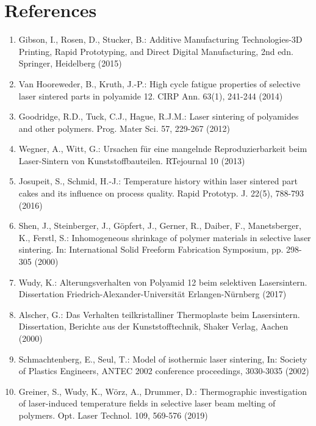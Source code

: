 \documentclass[10pt]{article}
\begin{document}
\section*{References}
\begin{enumerate}
  \item Gibson, I., Rosen, D., Stucker, B.: Additive Manufacturing Technologies-3D Printing, Rapid Prototyping, and Direct Digital Manufacturing, 2nd edn. Springer, Heidelberg (2015)

  \item Van Hooreweder, B., Kruth, J.-P.: High cycle fatigue properties of selective laser sintered parts in polyamide 12. CIRP Ann. 63(1), 241-244 (2014)

  \item Goodridge, R.D., Tuck, C.J., Hague, R.J.M.: Laser sintering of polyamides and other polymers. Prog. Mater Sci. 57, 229-267 (2012)

  \item Wegner, A., Witt, G.: Ursachen für eine mangelnde Reproduzierbarkeit beim Laser-Sintern von Kunststoffbauteilen. RTejournal 10 (2013)

  \item Josupeit, S., Schmid, H.-J.: Temperature history within laser sintered part cakes and its influence on process quality. Rapid Prototyp. J. 22(5), 788-793 (2016)

  \item Shen, J., Steinberger, J., Göpfert, J., Gerner, R., Daiber, F., Manetsberger, K., Ferstl, S.: Inhomogeneous shrinkage of polymer materials in selective laser sintering. In: International Solid Freeform Fabrication Symposium, pp. 298-305 (2000)

  \item Wudy, K.: Alterungsverhalten von Polyamid 12 beim selektiven Lasersintern. Dissertation Friedrich-Alexander-Universität Erlangen-Nürnberg (2017)

  \item Alscher, G.: Das Verhalten teilkristalliner Thermoplaste beim Lasersintern. Dissertation, Berichte aus der Kunststofftechnik, Shaker Verlag, Aachen (2000)

  \item Schmachtenberg, E., Seul, T.: Model of isothermic laser sintering, In: Society of Plastics Engineers, ANTEC 2002 conference proceedings, 3030-3035 (2002)

  \item Greiner, S., Wudy, K., Wörz, A., Drummer, D.: Thermographic investigation of laser-induced temperature fields in selective laser beam melting of polymers. Opt. Laser Technol. 109, 569-576 (2019)


\end{enumerate}
\end{document}
